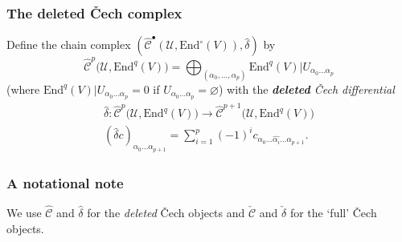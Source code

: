 \documentclass{beamer}
\begin{document}
            \begin{frame}\frametitle{The deleted Čech complex}
                \begin{definition}
                    Define the chain complex $(\hat{\mathscr{C}}^\bullet(\mathcal{U},\mathrm{End}^\circ(V)),\hat{\delta})$ by
                    \begin{equation*}
                        \hat{\mathscr{C}}^p\big(\mathcal{U},\mathrm{End}^q(V)\big) = \bigoplus_{(\alpha_0,\ldots,\alpha_p)} \mathrm{End}^q(V)|U_{\alpha_0\ldots\alpha_p}
                    \end{equation*}
                    (where $\mathrm{End}^q(V)|U_{\alpha_0\ldots\alpha_p}=0$ if $U_{\alpha_0\ldots\alpha_p}=\varnothing$) with the \emph{\textbf{deleted} Čech differential}
                    \begin{gather*}
                        \hat{\delta} \colon \hat{\mathscr{C}}^p\big(\mathcal{U},\mathrm{End}^q(V)\big) \to \hat{\mathscr{C}}^{p+1}\big(\mathcal{U},\mathrm{End}^q(V)\big)\\
                        (\hat{\delta}c)_{\alpha_0\ldots\alpha_{p+1}} = \sum_{i=1}^p (-1)^i c_{\alpha_0\ldots\widehat{\alpha_i}\ldots\alpha_{p+1}}.
                    \end{gather*}
                \end{definition}
            \end{frame}

            \begin{frame}\frametitle{A notational note}
                We use $\hat{\mathscr{C}}$ and $\hat{\delta}$ for the \emph{deleted} Čech objects and $\check{\mathscr{C}}$ and $\check{\delta}$ for the `full' Čech objects.
            \end{frame}
\end{document}
